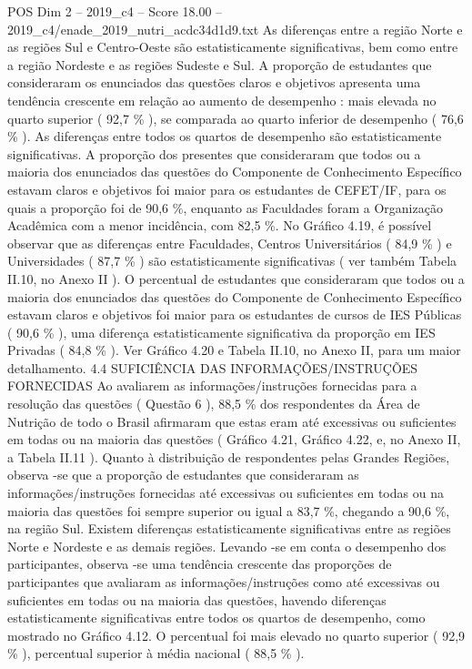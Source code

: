 \begin{textsample}{POS Dim 2 – 2019\_c4 – Score 18.00 – 2019\_c4/enade\_2019\_nutri\_acdc34d1d9.txt}
As diferenças entre a região Norte e as regiões Sul e Centro-Oeste são estatisticamente significativas, bem como entre a região Nordeste e as regiões Sudeste e Sul.
A proporção de estudantes que consideraram os enunciados das questões claros e objetivos apresenta uma tendência crescente em relação ao aumento de desempenho : mais elevada no quarto superior ( 92,7 \% ), se comparada ao quarto inferior de desempenho ( 76,6 \% ).
As diferenças entre todos os quartos de desempenho são estatisticamente significativas.
A proporção dos presentes que consideraram que todos ou a maioria dos enunciados das questões do Componente de Conhecimento Específico estavam claros e objetivos foi maior para os estudantes de CEFET/IF, para os quais a proporção foi de 90,6 \%, enquanto as Faculdades foram a Organização Acadêmica com a menor incidência, com 82,5 \%.
No Gráfico 4.19, é possível observar que as diferenças entre Faculdades, Centros Universitários ( 84,9 \% ) e Universidades ( 87,7 \% ) são estatisticamente significativas ( ver também Tabela II.10, no Anexo II ).
O percentual de estudantes que consideraram que todos ou a maioria dos enunciados das questões do Componente de Conhecimento Específico estavam claros e objetivos foi maior para os estudantes de cursos de IES Públicas ( 90,6 \% ), uma diferença estatisticamente significativa da proporção em IES Privadas ( 84,8 \% ).
Ver Gráfico 4.20 e Tabela II.10, no Anexo II, para um maior detalhamento. 4.4 SUFICIÊNCIA DAS INFORMAÇÕES/INSTRUÇÕES FORNECIDAS Ao avaliarem as informações/instruções fornecidas para a resolução das questões ( Questão 6 ), 88,5 \% dos respondentes da Área de Nutrição de todo o Brasil afirmaram que estas eram até excessivas ou suficientes em todas ou na maioria das questões ( Gráfico 4.21, Gráfico 4.22, e, no Anexo II, a Tabela II.11 ).
Quanto à distribuição de respondentes pelas Grandes Regiões, observa -se que a proporção de estudantes que consideraram as informações/instruções fornecidas até excessivas ou suficientes em todas ou na maioria das questões foi sempre superior ou igual a 83,7 \%, chegando a 90,6 \%, na região Sul.
Existem diferenças estatisticamente significativas entre as regiões Norte e Nordeste e as demais regiões.
Levando -se em conta o desempenho dos participantes, observa -se uma tendência crescente das proporções de participantes que avaliaram as informações/instruções como até excessivas ou suficientes em todas ou na maioria das questões, havendo diferenças estatisticamente significativas entre todos os quartos de desempenho, como mostrado no Gráfico 4.12.
O percentual foi mais elevado no quarto superior ( 92,9 \% ), percentual superior à média nacional ( 88,5 \% ).

\end{textsample}
